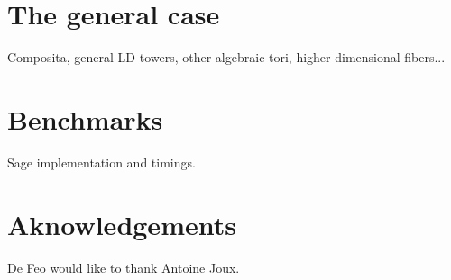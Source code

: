 \documentclass{sig-alternate}
\begin{document}

\section{The general case}
\label{sec:general}

Composita, general LD-towers, other algebraic tori, higher dimensional
fibers...


\section{Benchmarks}
\label{sec:bench}

Sage implementation and timings.


\section{Aknowledgements}
De Feo would like to thank Antoine Joux.



\end{document}
